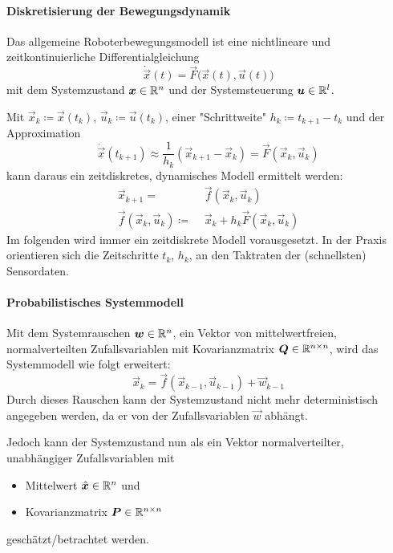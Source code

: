 				\paragraph{Diskretisierung der Bewegungsdynamik}
					Das allgemeine Roboterbewegungsmodell ist eine nichtlineare und zeitkontinuierliche Differentialgleichung
					\begin{equation*}
						\dot{\vec{x}}(t) = \vec{F}\big(\vec{x}(t), \vec{u}(t)\big)
					\end{equation*}
					mit dem Systemzustand \( \bm{x} \in \mathbb{R}^n \) und der Systemsteuerung \( \bm{u} \in \mathbb{R}^l \).

					Mit \( \vec{x}_k \coloneqq \vec{x}(t_k) \), \( \vec{u}_k \coloneqq \vec{u}(t_k) \), einer "Schrittweite" \( h_k \coloneqq t_{k + 1} - t_k \) und der Approximation
					\begin{equation*}
						\dot{\vec{x}}(t_{k + 1}) \approx \frac{1}{h_k} (\vec{x}_{k + 1} - \vec{x}_k) = \vec{F}(\vec{x}_k, \vec{u}_k)
					\end{equation*}
					kann daraus ein zeitdiskretes, dynamisches Modell ermittelt werden:
					\begin{align*}
						\vec{x}_{k + 1} =                       & \,\, \vec{f}(\vec{x}_k, \vec{u}_k)                 \\
						\vec{f}(\vec{x}_k, \vec{u}_k) \coloneqq & \,\, \vec{x}_k + h_k \vec{F}(\vec{x}_k, \vec{u}_k)
					\end{align*}
					Im folgenden wird immer ein zeitdiskrete Modell vorausgesetzt. In der Praxis orientieren sich die Zeitschritte \( t_k \), \bzw \( h_k \), an den Taktraten der (schnellsten) Sensordaten.

				\paragraph{Probabilistisches Systemmodell}
					Mit dem Systemrauschen \( \bm{w} \in \mathbb{R}^n \), ein Vektor von mittelwertfreien, normalverteilten Zufallsvariablen mit Kovarianzmatrix \( \bm{Q} \in \mathbb{R}^{n \times n} \), wird das Systemmodell wie folgt erweitert:
					\begin{equation*}
						\vec{x}_k = \vec{f}(\vec{x}_{k - 1}, \vec{u}_{k - 1}) + \vec{w}_{k - 1}
					\end{equation*}
					Durch dieses Rauschen kann der Systemzustand nicht mehr deterministisch angegeben werden, da er von der Zufallsvariablen \( \vec{w} \) abhängt.

					Jedoch kann der Systemzustand nun als ein Vektor normalverteilter, unabhängiger Zufallsvariablen mit
					\begin{itemize}
						\item Mittelwert \( \hat{\bm{x}} \in \mathbb{R}^n \) und
						\item Kovarianzmatrix \( \bm{P} \in \mathbb{R}^{n \times n} \)
					\end{itemize}
					geschätzt/betrachtet werden.

